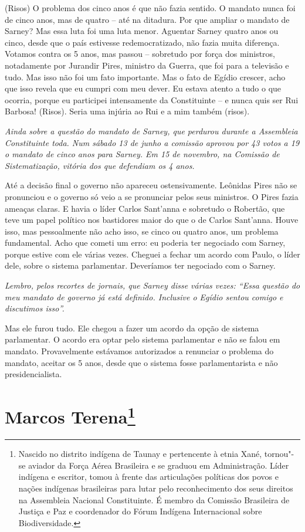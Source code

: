 (Risos) O problema dos cinco anos é que não fazia
sentido. O mandato nunca foi de cinco anos, mas de quatro -- até na
ditadura. Por que ampliar o mandato de Sarney? Mas essa luta foi uma
luta menor. Aguentar Sarney quatro anos ou cinco, desde que o país
estivesse redemocratizado, não fazia muita diferença. Votamos contra os
5 anos, mas passou -- sobretudo por força dos ministros, notadamente por
Jurandir Pires, ministro da Guerra, que foi para a televisão e tudo. Mas
isso não foi um fato importante. Mas o fato de Egídio crescer, acho que
isso revela que eu cumpri com meu dever. Eu estava atento a tudo o que
ocorria, porque eu participei intensamente da Constituinte -- e nunca
quis ser Rui Barbosa! (Risos). Seria uma injúria ao Rui e a mim também
(risos).

\medskip

\noindent\emph{Ainda sobre a questão do mandato de Sarney, que perdurou durante
a Assembleia Constituinte toda. Num sábado 13 de junho a comissão
aprovou por 43 votos a 19 o mandato de cinco anos para Sarney. Em 15 de
novembro, na Comissão de Sistematização, vitória dos que defendiam os 4
anos.}

Até a decisão final o governo não apareceu
ostensivamente. Leônidas Pires não se pronunciou e o governo só veio a
se pronunciar pelos seus ministros. O Pires fazia ameaças claras. E havia
o líder Carlos Sant'anna e sobretudo o Robertão, que teve um papel
político nos bastidores maior do que o de Carlos Sant'anna. Houve isso,
mas pessoalmente não acho isso, se cinco ou quatro anos, um problema
fundamental. Acho que cometi um erro: eu poderia ter negociado com
Sarney, porque estive com ele várias vezes. Cheguei a fechar um acordo
com Paulo, o líder dele, sobre o sistema parlamentar. Deveríamos ter
negociado com o Sarney.

\medskip

\noindent\emph{Lembro, pelos recortes de jornais, que Sarney disse várias
vezes: ``Essa questão do meu mandato de governo já está definido.
Inclusive o Egídio sentou comigo e discutimos isso''.}

Mas ele furou tudo. Ele chegou a fazer um acordo da
opção de sistema parlamentar. O acordo era optar pelo sistema
parlamentar e não se falou em mandato. Provavelmente estávamos
autorizados a renunciar o problema do mandato, aceitar os 5 anos, desde
que o sistema fosse parlamentarista e não presidencialista.

\chapter{Marcos Terena\footnote{Nascido no distrito indígena de Taunay e pertencente à etnia Xané,
tornou"-se aviador da Força Aérea Brasileira e se graduou em
Administração. Líder indígena e escritor, tomou à frente das
articulações políticas dos povos e nações indígenas brasileiras para
lutar pelo reconhecimento dos seus direitos na Assembleia Nacional
Constituinte. É membro da Comissão Brasileira de Justiça e Paz e
coordenador do Fórum Indígena Internacional sobre Biodiversidade.}}

